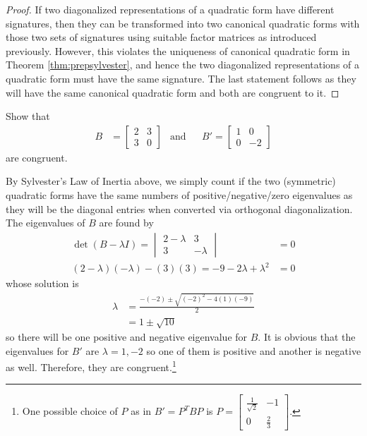 \begin{proof}
If two diagonalized representations of a quadratic form have different signatures, then they can be transformed into two canonical quadratic forms with those two sets of signatures using suitable factor matrices as introduced previously. However, this violates the uniqueness of canonical quadratic form in Theorem \ref{thm:prepsylvester}, and hence the two diagonalized representations of a quadratic form must have the same signature. The last statement follows as they will have the same canonical quadratic form and both are congruent to it.
\end{proof}

\begin{exmp}
Show that
\begin{align*}
B &= \begin{bmatrix}
2 & 3 \\
3 & 0
\end{bmatrix}
& \text{and} & 
& B' = 
\begin{bmatrix}
1 & 0 \\
0 & -2
\end{bmatrix}
\end{align*}
are congruent.
\end{exmp}
\begin{solution}
By Sylvester's Law of Inertia above, we simply count if the two (symmetric) quadratic forms have the same numbers of positive/negative/zero eigenvalues as they will be the diagonal entries when converted via orthogonal diagonalization. The eigenvalues of $B$ are found by
\begin{align*}
\det(B - \lambda I) = 
\begin{vmatrix}
2 - \lambda & 3 \\
3 & - \lambda
\end{vmatrix} &= 0 \\
(2-\lambda)(-\lambda) - (3)(3) = -9 - 2\lambda + \lambda^2 &= 0
\end{align*}
whose solution is 
\begin{align*}
\lambda &= \frac{-(-2) \pm \sqrt{(-2)^2 - 4(1)(-9)}}{2} \\
&= 1 \pm \sqrt{10}
\end{align*}
so there will be one positive and negative eigenvalue for $B$. It is obvious that the eigenvalues for $B'$ are $\lambda = 1, -2$ so one of them is positive and another is negative as well. Therefore, they are congruent.\footnote{One possible choice of $P$ as in $B' = P^TBP$ is $P = 
\begin{bmatrix}
\frac{1}{\sqrt{2}}&-1\\ 
0&\frac{2}{3}
\end{bmatrix}$.}
\end{solution}

